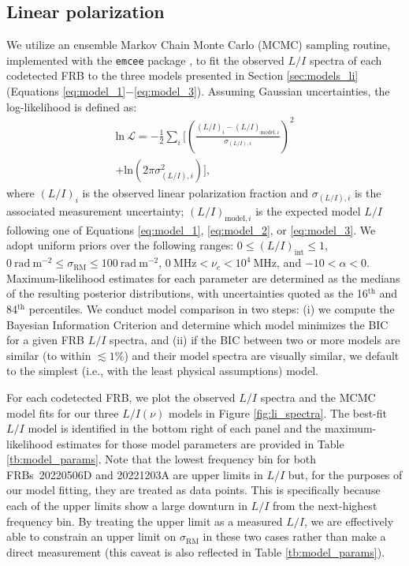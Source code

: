 \documentclass[twocolumn, linenumbers]{aastex701}
\begin{document}
\subsection{Linear polarization} \label{sec:results_li}
We utilize an ensemble Markov Chain Monte Carlo (MCMC) sampling routine, implemented with the {\tt emcee} package \citep{2013PASP..125..306F}, to fit the observed $L/I$ spectra of each codetected FRB to the three models presented in Section \ref{sec:models_li} (Equations \ref{eq:model_1}$-$\ref{eq:model_3}). Assuming Gaussian uncertainties, the log-likelihood is defined as:
\begin{multline}
\mathrm{ln}~\mathcal{L} = -\frac{1}{2}\sum_i \bigg[ \left( \frac{(L/I)_i - (L/I)_{\mathrm{model,}i}}{\sigma_{(L/I),i}} \right)^2 \\
+ \mathrm{ln} \left(2 \pi \sigma_{(L/I),i}^2 \right) \bigg], \label{eq:log_likelihood}
\end{multline}
where $(L/I)_i$ is the observed linear polarization fraction and $\sigma_{(L/I),i}$ is the associated measurement uncertainty; $(L/I)_{\mathrm{model,}i}$ is the expected model $L/I$ following one of Equations \ref{eq:model_1}, \ref{eq:model_2}, or \ref{eq:model_3}. We adopt uniform priors over the following ranges: $0 \leq(L/I)_\mathrm{int} \leq 1$, $0~\mathrm{rad}~\mathrm{m}^{-2} \leq \sigma_\mathrm{RM} \leq 100~\mathrm{rad}~\mathrm{m}^{-2}$, $0~\mathrm{MHz} < \nu_c <10^4~\mathrm{MHz}$, and $-10 < \alpha < 0$. Maximum-likelihood estimates for each parameter are determined as the medians of the resulting posterior distributions, with uncertainties quoted as the 16$^\mathrm{th}$ and 84$^\mathrm{th}$ percentiles. We conduct model comparison in two steps: (i) we compute the Bayesian Information Criterion \citep[BIC;][]{1978AnSta...6..461S} and determine which model minimizes the BIC for a given FRB $L/I$ spectra, and (ii) if the BIC between two or more models are similar (to within $\lesssim 1\%$) and their model spectra are visually similar, we default to the simplest (i.e., with the least physical assumptions) model. 

For each codetected FRB, we plot the observed $L/I$ spectra and the MCMC model fits for our three $L/I(\nu)$ models in Figure \ref{fig:li_spectra}. The best-fit $L/I$ model is identified in the bottom right of each panel and the maximum-likelihood estimates for those model parameters are provided in Table \ref{tb:model_params}. Note that the lowest frequency bin for both FRBs~20220506D and 20221203A are upper limits in $L/I$ but, for the purposes of our model fitting, they are treated as data points. This is specifically because each of the upper limits show a large downturn in $L/I$ from the next-highest frequency bin. By treating the upper limit as a measured $L/I$, we are effectively able to constrain an upper limit on $\sigma_\mathrm{RM}$ in these two cases rather than make a direct measurement (this caveat is also reflected in Table \ref{tb:model_params}).
\end{document}
